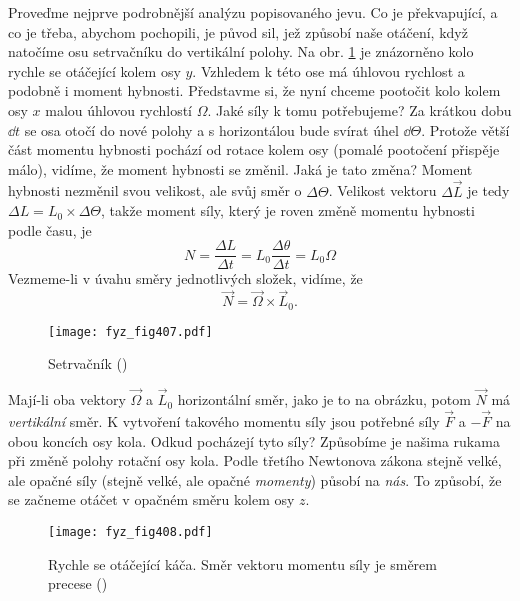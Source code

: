     Proveďme nejprve podrobnější analýzu popisovaného jevu. Co je překvapující, a co je třeba,
    abychom pochopili, je původ sil, jež způsobí naše otáčení, když natočíme osu setrvačníku do
    vertikální polohy. Na obr. \ref{fyz:fig407} je znázorněno kolo rychle se otáčející kolem osy
    \(y\). Vzhledem k této ose má úhlovou rychlost a podobně i moment hybnosti. Představme si, že
    nyní chceme pootočit kolo kolem osy \(x\) malou úhlovou rychlostí \(\Omega\). Jaké síly k tomu
    potřebujeme? Za krátkou dobu \(\dd{t}\) se osa otočí do nové polohy a s horizontálou bude svírat
    úhel \(\dd{\Theta}\). Protože větší část momentu hybnosti pochází od rotace kolem osy (pomalé
    pootočení přispěje málo), vidíme, že moment hybnosti se změnil. Jaká je tato změna? Moment
    hybnosti nezměnil svou velikost, ale svůj směr o \(\Delta\Theta\). Velikost vektoru
    \(\Delta\vec{L}\) je tedy \(\Delta L = L_0\times\Delta\Theta\), takže moment síly, který je
    roven změně momentu hybnosti podle času, je
    \begin{equation*}
      N = \dfrac{ΔL}{Δt} = L_0\dfrac{Δθ}{Δt}=L_0Ω
    \end{equation*}
    Vezmeme-li v úvahu směry jednotlivých složek, vidíme, že
    \begin{equation}\label{fyz:eq724}
      \vec{N} =\vec{Ω}\times\vec{L}_0.
    \end{equation}

    \begin{figure}[ht!] %
      \centering
      \texttt{[image: fyz\_fig407.pdf]}
      \caption{Setrvačník
               (\cite[s.~279]{Feynman01})}
      \label{fyz:fig407}
    \end{figure}

    Mají-li oba vektory \(\vec{\Omega}\) a \(\vec{L}_0\) horizontální směr, jako je to na obrázku,
    potom \(\vec{N}\) má \emph{vertikální} směr. K vytvoření takového momentu síly jsou potřebné
    síly \(\vec{F}\) a \(-\vec{F}\) na obou koncích osy kola. Odkud pocházejí tyto síly? Způsobíme
    je našima rukama při změně polohy rotační osy kola. Podle třetího Newtonova zákona stejně velké,
    ale opačné síly (stejně velké, ale opačné \emph{momenty}) působí na \emph{nás}. To způsobí, že
    se začneme otáčet v opačném směru kolem osy \(z\).   
    
    \begin{figure}[ht!] %
      \centering
      \texttt{[image: fyz\_fig408.pdf]}
      \caption{Rychle se otáčející káča. Směr vektoru momentu síly je směrem precese 
               (\cite[s.~280]{Feynman01})}
      \label{fyz:fig408}
    \end{figure}

